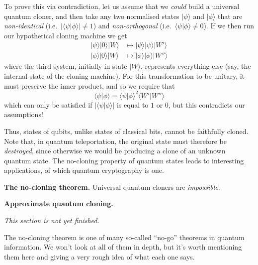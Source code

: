 \documentclass[fleqn,a4paper]{article}
\newenvironment{idea}{\everypar{\setlength{\parindent}{1.5em}}}{}
\newenvironment{technical}[1]{\textbf{#1.}\par\vspace{.5\baselineskip}\everypar{\setlength{\parindent}{1.5em}}}{}
\newenvironment{todo}{\color{primary}\emph{This section is not yet finished.}}{}
\theoremstyle{definition}
\theoremstyle{definition}
\theoremstyle{definition}
\theoremstyle{definition}
\theoremstyle{remark}
\begin{document}
To prove this via contradiction, let us assume that we \emph{could} build a universal quantum cloner, and then take any two normalised states \(|\psi\rangle\) and \(|\phi\rangle\) that are \emph{non-identical} (i.e.~\(|\langle\psi|\phi\rangle|\neq1\)) and \emph{non-orthogonal} (i.e.~\(\langle\psi|\phi\rangle\neq0\)).
If we then run our hypothetical cloning machine we get
\[
  \begin{aligned}
    |\psi\rangle|0\rangle|W\rangle
    &\longmapsto |\psi\rangle|\psi\rangle|W'\rangle
  \\|\phi\rangle|0\rangle|W\rangle
    &\longmapsto |\phi\rangle|\phi\rangle|W''\rangle
  \end{aligned}
\]
where the third system, initially in state \(|W\rangle\), represents everything else (say, the internal state of the cloning machine).
For this transformation to be unitary, it must preserve the inner product, and so we require that
\[
  \langle\psi|\phi\rangle
  = \langle\psi|\phi\rangle^2 \langle W'|W''\rangle
\]
which can only be satisfied if \(|\langle\psi|\phi\rangle|\) is equal to \(1\) or \(0\), but this contradicts our assumptions!

Thus, states of qubits, unlike states of classical bits, cannot be faithfully cloned.
Note that, in quantum teleportation, the original state must therefore be \emph{destroyed}, since otherwise we would be producing a clone of an unknown quantum state.
The no-cloning property of quantum states leads to interesting applications, of which quantum cryptography is one.

\begin{idea}
\textbf{The no-cloning theorem.}
Universal quantum cloners are \emph{impossible}.

\end{idea}

\begin{technical}{Approximate quantum cloning}

\begin{todo}

\end{todo}

\end{technical}

The no-cloning theorem is one of many so-called ``no-go'' theorems in quantum information.
We won't look at all of them in depth, but it's worth mentioning them here and giving a very rough idea of what each one says.
\end{document}
